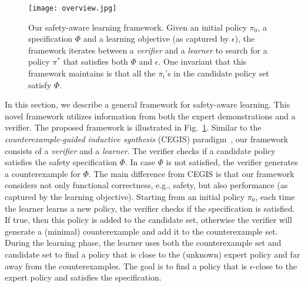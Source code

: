 \begin{figure}
\centering
  \texttt{[image: overview.jpg]}
\caption[Counterexample-Guided Apprenticeship Learning]{
Our safety-aware learning framework. Given an initial policy $\pi_0$, a specification $\Phi$ and a learning objective (as captured by $\epsilon$), the framework iterates between a {\it verifier} and a {\it learner} to search for a policy $\pi^*$ that satisfies both $\Phi$ and $\epsilon$. One invariant that this framework maintains is that all the $\pi_i$'s in the candidate policy set satisfy $\Phi$.}
\label{fig:sec4_1}
\end{figure}
In this section, we describe a general framework for safety-aware learning. 
This novel framework utilizes information from both the expert demonstrations and a verifier. 
The proposed framework is illustrated in Fig.~\ref{fig:sec4_1}. Similar to the \emph{counterexample-guided inductive synthesis} (CEGIS) paradigm~\cite{CEGIS}, our framework consists of a {\it verifier} and a {\it learner}. The verifier checks if a candidate policy satisfies the safety specification $\Phi$. In case $\Phi$ is not satisfied, the verifier generates a counterexample for $\Phi$. 
The main difference from CEGIS is that our framework considers not only functional correctness, e.g., safety, but also performance (as captured by the learning objective). Starting from an initial policy $\pi_0$, each time the learner learns a new policy, the verifier checks if the specification is satisfied. If true, then this policy is added to the candidate set, otherwise the verifier will generate a (minimal) counterexample and add it to the counterexample set. During the learning phase, the learner uses both the counterexample set and candidate set to find a policy that is close to the (unknown) expert policy and far away from the counterexamples. The goal is to find a policy that is $\epsilon$-close to the expert policy and satisfies the specification. 

